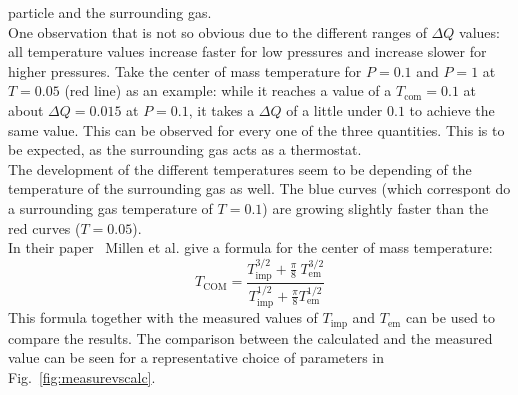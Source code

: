\documentclass[12pt]{article}
\begin{document}
particle and the surrounding gas.\\
One observation that is not so obvious due to the different ranges of $\Delta Q$ values: all temperature values increase faster for low pressures and
increase slower for higher pressures. Take the center of mass temperature for $P=0.1$ and $P=1$ at $T=0.05$ (red line) as an example: while it reaches
a value of a $T_\text{com} = 0.1$ at about $\Delta Q = 0.015$ at $P=0.1$, it takes a $\Delta Q$ of a little under $0.1$ to achieve the same value.
This can be observed for every one of the three quantities. This is to be expected, as the surrounding gas acts as a thermostat. \\
The development of the different temperatures seem to be depending of the temperature of the surrounding gas as well. The blue curves (which
correspont do a surrounding gas temperature of $T=0.1$) are growing slightly faster than the red curves ($T=0.05$).\\
In their paper~\cite{MillenJ.2014} Millen et al. give a formula for the center of mass temperature:
\begin{equation}
    T_\text{COM} = \frac{T_\text{imp}^{3/2}+\tfrac\pi 8 \ T_\text{em}^{3/2}}{T_\text{imp}^{1/2}+\tfrac\pi8 T_\text{em}^{1/2}}
\end{equation}
This formula together with the measured values of $T_\text{imp}$ and $T_\text{em}$ can be used to compare the results. The comparison between the
calculated and the measured value can be seen for a representative choice of parameters in Fig.~\ref{fig:measurevscalc}.








\end{document}
